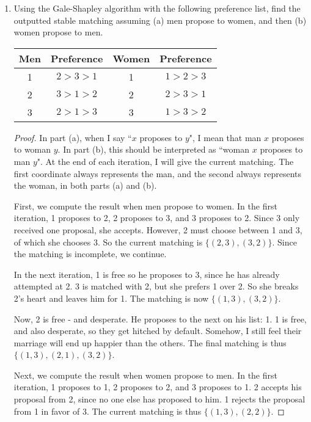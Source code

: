 \documentclass[10pt]{article}
\begin{document}
\begin{enumerate}
\item Using the Gale-Shapley algorithm with the following preference list, find the outputted stable matching assuming (a) men propose to women, and then (b) women propose to men.

\vspace{.1cm}

\begin{center}
\begin{tabular}{|c|c|c|c|}
\hline 
\textbf{Men} & \textbf{Preference} & \textbf{Women} & \textbf{Preference} \\ 
\hline 
1 & $2 > 3 > 1$ & 1 & $1 > 2 > 3$ \\ 
\hline 
2 & $3>1>2$ & 2 & $2>3>1$ \\ 
\hline 
3 & $2>1>3$ & 3 & $1>3>2$ \\ 
\hline 
\end{tabular}
\end{center}

\begin{proof}
In part (a), when I say ``$x$ proposes to $y$", I mean that man $x$ proposes to woman $y$.  In part (b), this should be interpreted as ``woman $x$ proposes to man $y$".  At the end of each iteration, I will give the current matching.  The first coordinate always represents the man, and the second always represents the woman, in both parts (a) and (b).

First, we compute the result when men propose to women.  In the first iteration, 1 proposes to 2, 2 proposes to 3, and 3 proposes to 2.  Since 3 only received one proposal, she accepts.  However, 2 must choose between 1 and 3, of which she chooses 3.  So the current matching is $\{ (2,3),(3,2)\}$.  Since the matching is incomplete, we continue.

In the next iteration, 1 is free so he proposes to 3, since he has already attempted at 2.  3 is matched with 2, but she prefers 1 over 2.  So she breaks 2's heart and leaves him for 1.  The matching is now $\{(1,3),(3,2)\}$.

Now, 2 is free - and desperate.  He proposes to the next on his list: 1.  1 is free, and also desperate, so they get hitched by default.  Somehow, I still feel their marriage will end up happier than the others.  The final matching is thus $\{(1,3),(2,1),(3,2)\}$.

Next, we compute the result when women propose to men.  In the first iteration, 1 proposes to 1, 2 proposes to 2, and 3 proposes to 1.  2 accepts his proposal from 2, since no one else has proposed to him.  1 rejects the proposal from 1 in favor of 3.  The current matching is thus $\{(1,3),(2,2)\}$.


\end{proof}
\end{enumerate}
\end{document}

